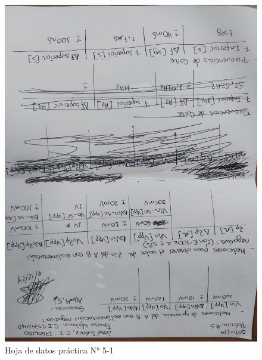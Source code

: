 \begin{figure}[ht]
    \centering
    \includegraphics[width=1.0\textwidth, angle=90]{src/images/p5/p5-hoja-de-datos-1.jpg}
    \caption{Hoja de datos práctica N° 5-1}
    \label{fig:hoja-de-datos-p5-1}
\end{figure}

